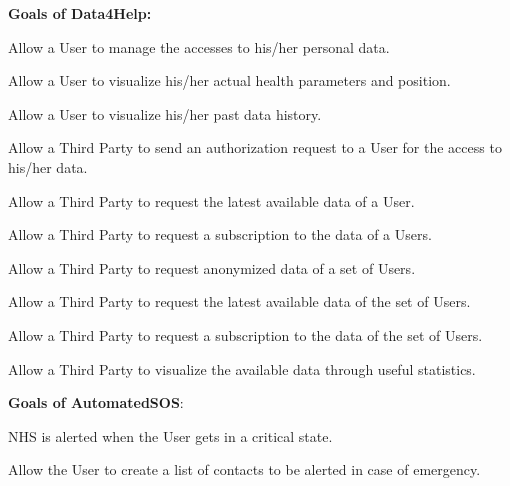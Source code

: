 \textbf{Goals of Data4Help:}
\begin{enumerate}[label={[}G3.\arabic*{]}]

    \item \label{goal:user1}Allow a User to manage the accesses to his/her personal data.
    \item \label{goal:user2}Allow a User to visualize his/her actual health parameters and position.
    \item \label{goal:user3}Allow a User to visualize his/her past data history.

    \item \label{goal:parties1}Allow a Third Party to send an authorization request to a User for the access to his/her data.
    
    \begin{enumerate}[label={[}G3.4.\arabic*{]}]
        \item \label{goal:parties2}Allow a Third Party to  request the latest available data of a User.
        \item \label{goal:parties3}Allow a Third Party to request a subscription to the data of a Users.
    \end{enumerate}

    \item \label{goal:parties4}Allow a Third Party to request anonymized data of a set of Users.
    
     \begin{enumerate}[label={[}G3.5.\arabic*{]}]
        \item \label{goal:parties5}Allow a Third Party to request the latest available data of the set of Users.
        \item \label{goal:parties6}Allow a Third Party to request a subscription to the data of the set of Users.
    \end{enumerate}
    
    \item \label{goal:parties7}Allow a Third Party to visualize the available data through useful statistics.
    \newline
    
\end{enumerate}

\textbf{Goals of AutomatedSOS}:
\begin{enumerate}[label={[}G4.\arabic*{]}]

\item \label{goal:sos1}NHS is alerted when the User gets in a critical state.
\item \label{goal:sos2}Allow the User to create a list of contacts to be alerted in case of emergency.
    
\end{enumerate}
\newpage

